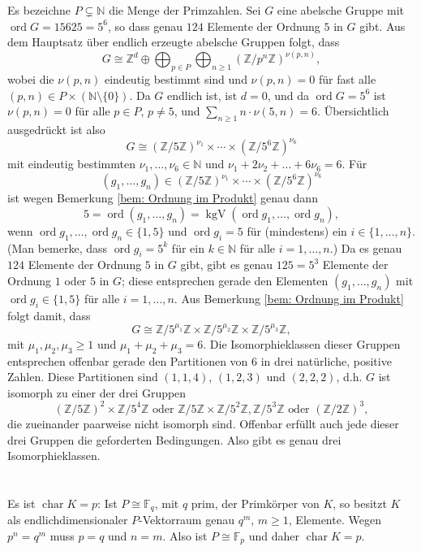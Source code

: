 \documentclass[a4paper,10pt]{article}
\theoremstyle{definition}
\newcommand{\N}{\mathbb{N}}
\newcommand{\Z}{\mathbb{Z}}
\newcommand{\F}{\mathbb{F}}
\newcommand{\ord}{\operatorname{ord}}
\newcommand{\kchar}{\operatorname{char}}
\newcommand{\kgV}{\operatorname{kgV}}
\begin{document}
Es bezeichne $P \subsetneq \N$ die Menge der Primzahlen.
Sei $G$ eine abelsche Gruppe mit $\ord G = 15625 = 5^6$, so dass genau $124$ Elemente der Ordnung $5$ in $G$ gibt. Aus dem Hauptsatz über endlich erzeugte abelsche Gruppen folgt, dass
\[
 G \cong \Z^d \oplus \bigoplus_{p \in P} \bigoplus_{n \geq 1} (\Z/p^n\Z)^{\nu(p,n)},
\]
wobei die $\nu(p,n)$ eindeutig bestimmt sind und $\nu(p,n) = 0$ für fast alle $(p,n) \in P \times (\N\setminus\{0\})$. Da $G$ endlich ist, ist $d = 0$, und da $\ord G = 5^6$ ist $\nu(p,n) = 0$ für alle $p \in P$, $p \neq 5$, und $\sum_{n \geq 1} n \cdot \nu(5,n) = 6$. Übersichtlich ausgedrückt ist also
\[
 G \cong (\Z/5\Z)^{\nu_1} \times \cdots \times (\Z/5^6\Z)^{\nu_6}
\]
mit eindeutig bestimmten $\nu_1, \ldots, \nu_6 \in \N$ und $\nu_1 + 2 \nu_2 + \ldots + 6 \nu_6 = 6$. Für
\[
 (g_1, \ldots, g_n) \in (\Z/5\Z)^{\nu_1} \times \cdots \times (\Z/5^6\Z)^{\nu_6}
\]
ist wegen Bemerkung \ref{bem: Ordnung im Produkt} genau dann
\[
 5 = \ord (g_1, \ldots, g_n) = \kgV(\ord g_1, \ldots, \ord g_n),
\]
wenn $\ord g_1, \ldots, \ord g_n \in \{1,5\}$ und $\ord g_i = 5$ für (mindestens) ein $i \in \{1, \ldots, n\}$. (Man bemerke, dass $\ord g_i = 5^k$ für ein $k \in \N$ für alle $i=1,\ldots,n$.)
Da es genau $124$ Elemente der Ordnung $5$ in $G$ gibt, gibt es genau $125 = 5^3$ Elemente der Ordnung $1$ oder $5$ in $G$; diese entsprechen gerade den Elementen $(g_1, \ldots, g_n)$ mit $\ord g_i \in \{1,5\}$ für alle $i=1,\ldots,n$. Aus Bemerkung \ref{bem: Ordnung im Produkt} folgt damit, dass
\[
 G \cong \Z/5^{\mu_1}\Z \times \Z/5^{\mu_2}\Z \times \Z/5^{\mu_3}\Z,
\]
mit $\mu_1, \mu_2, \mu_3 \geq 1$ und $\mu_1 + \mu_2 + \mu_3 = 6$. Die Isomorphieklassen dieser Gruppen entsprechen offenbar gerade den Partitionen von $6$ in drei natürliche, positive Zahlen. Diese Partitionen sind $(1,1,4)$, $(1,2,3)$ und $(2,2,2)$, d.h. $G$ ist isomorph zu einer der drei Gruppen
\[
 (\Z/5\Z)^2 \times \Z/5^4\Z \text{ oder } \Z/5\Z \times \Z/5^2\Z, \Z/5^3\Z \text{ oder } (\Z/2\Z)^3,
\]
die zueinander paarweise nicht isomorph sind. Offenbar erfüllt auch jede dieser drei Gruppen die geforderten Bedingungen. Also gibt es genau drei Isomorphieklassen.





\section{}


\subsection{}
Es ist $\kchar K = p$: Ist $P \cong \F_q$, mit $q$ prim, der Primkörper von $K$, so besitzt $K$ als endlichdimensionaler $P$-Vektorraum genau $q^m$, $m \geq 1$, Elemente. Wegen $p^n = q^m$ muss $p = q$ und $n = m$. Also ist $P \cong \F_p$ und daher $\kchar K = p$.
\end{document}
